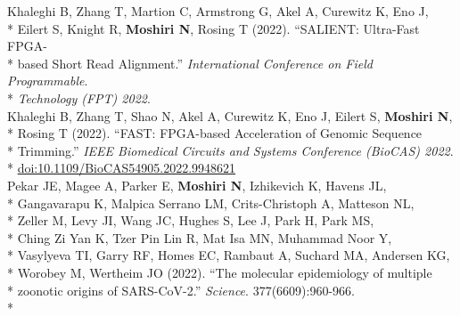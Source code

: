 \documentclass[margin,line]{res}
\begin{document}
\begin{resume}
\hspace*{4mm} Khaleghi B, Zhang T, Martion C, Armstrong G, Akel A, Curewitz K, Eno J,\\*
\hspace*{9mm}  Eilert S, Knight R, \textbf{Moshiri N}, Rosing T (2022). ``SALIENT: Ultra-Fast FPGA-\\*
\hspace*{9mm} based Short Read Alignment.'' \textit{International Conference on Field Programmable}.\\*\vspace{2mm}
\hspace*{7mm} \textit{Technology (FPT) 2022}.\\
\hspace*{4mm} Khaleghi B, Zhang T, Shao N, Akel A, Curewitz K, Eno J, Eilert S, \textbf{Moshiri N},\\*
\hspace*{9mm} Rosing T (2022). ``FAST: FPGA-based Acceleration of Genomic Sequence\\*
\hspace*{9mm} Trimming.'' \textit{IEEE Biomedical Circuits and Systems Conference (BioCAS) 2022}.\\*\vspace{2mm}
\hspace*{8mm} \href{https://doi.org/10.1109/BioCAS54905.2022.9948621}{doi:10.1109/BioCAS54905.2022.9948621}\\
\hspace*{4mm} Pekar JE, Magee A, Parker E, \textbf{Moshiri N}, Izhikevich K, Havens JL,\\*
\hspace*{9mm} Gangavarapu K, Malpica Serrano LM, Crits-Christoph A, Matteson NL,\\*
\hspace*{9mm} Zeller M, Levy JI, Wang JC, Hughes S, Lee J, Park H, Park MS,\\*
\hspace*{9mm} Ching Zi Yan K, Tzer Pin Lin R, Mat Isa MN, Muhammad Noor Y,\\*
\hspace*{9mm} Vasylyeva TI, Garry RF, Homes EC, Rambaut A, Suchard MA, Andersen KG,\\*
\hspace*{9mm} Worobey M, Wertheim JO (2022). ``The molecular epidemiology of multiple\\*
\hspace*{9mm} zoonotic origins of SARS-CoV-2.'' \textit{Science}. 377(6609):960-966.\\*\vspace{2mm}

\end{resume}
\end{document}
